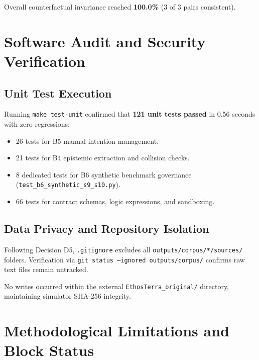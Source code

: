 \documentclass[11pt,a4paper]{article}
\begin{document}
Overall counterfactual invariance reached \textbf{100.0\%} (3 of 3 pairs consistent).

\section{Software Audit and Security Verification}

\subsection{Unit Test Execution}
Running \texttt{make test-unit} confirmed that \textbf{121 unit tests passed} in 0.56 seconds with zero regressions:
\begin{itemize}[itemsep=2pt]
    \item 26 tests for B5 manual intention management.
    \item 21 tests for B4 epistemic extraction and collision checks.
    \item 8 dedicated tests for B6 synthetic benchmark governance (\texttt{test\_b6\_synthetic\_s9\_s10.py}).
    \item 66 tests for contract schemas, logic expressions, and sandboxing.
\end{itemize}

\subsection{Data Privacy and Repository Isolation}
Following Decision D5, \texttt{.gitignore} excludes all \texttt{outputs/corpus/*/sources/} folders. Verification via \texttt{git status --ignored outputs/corpus/} confirms raw text files remain untracked.

No writes occurred within the external \texttt{EthosTerra\_original/} directory, maintaining simulator SHA-256 integrity.

\section{Methodological Limitations and Block Status}
\end{document}
